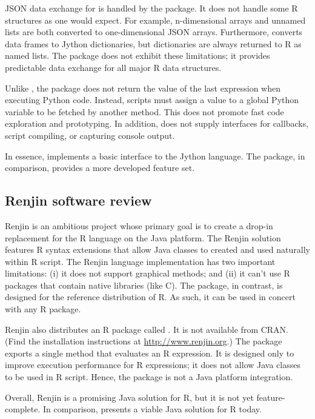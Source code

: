 JSON data exchange for  is handled by the  \citep{rjson} package. It does not handle some R structures as one would expect. For example, n-dimensional arrays and unnamed lists are both converted to one-dimensional JSON arrays. Furthermore,  converts data frames to Jython dictionaries, but dictionaries are always returned to R as named lists. The  package does not exhibit these limitations; it provides predictable data exchange for all major R data structures.

Unlike , the  package does not return the value of the last expression when executing Python code. Instead, scripts must assign a value to a global Python variable to be fetched by another  method. This does not promote fast code exploration and prototyping. In addition,  does not supply interfaces for callbacks, script compiling, or capturing console output.

In essence,  implements a basic interface to the Jython language. The  package, in comparison, provides a more developed feature set.

\subsection{Renjin software review}

Renjin \citep{renjin} is an ambitious project whose primary goal is to create a drop-in replacement for the R language on the Java platform. The Renjin solution features R syntax extensions that allow Java classes to created and used naturally within R script. The Renjin language implementation has two important limitations: (i) it does not support graphical methods; and (ii) it can't use R packages that contain native libraries (like C). The  package, in contrast, is designed for the reference distribution of R. As such, it can be used in concert with any R package.

Renjin also distributes an R package called . It is not available from CRAN. (Find the installation instructions at \url{http://www.renjin.org}.) The  package exports a single method that evaluates an R expression. It is designed only to improve execution performance for R expressions; it does not allow Java classes to be used in R script. Hence, the  package is not a Java platform integration.

Overall, Renjin is a promising Java solution for R, but it is not yet feature-complete. In comparison,  presents a viable Java solution for R today.

